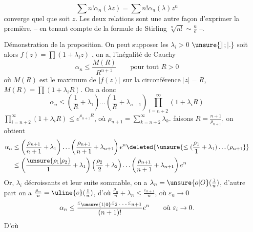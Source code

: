 \[ \sum n!\alpha_n(\lambda z)=\sum n!\alpha_n(\lambda)z^n \]
converge
quel que soit $z$. Les deux  relations
 sont une autre façon d'exprimer la première,
-- en tenant compte de la formule de
Stirling $\sqrt[n]{n!}\sim\frac{n}{e}$ --.

Démonstration de la proposition. On peut
supposer les $\lambda_i>0$  $\unsure{]|;|.}$ soit alors $f(z)=\prod(1+\lambda_i z)$
,   on a,  l'inégalité
de Cauchy
\[ \alpha_n\leq\frac{M(R)}{R^{n+1}}\qquad\text{pour tout }R>0 \]
où $M(R)$ est le maximum de $|f(z)|$ sur la
circonférence $|z|=R$,  $M(R)=\prod(1+\lambda_iR)$.
 On a donc
\[ \alpha_n\leq\left(\frac1R+\lambda_1\right)\ldots\left(\frac1R+\lambda_{n+1}\right)\prod_{i=n+2}^{\infty}(1+\lambda_i R) \]
  $\prod_{i=n+2}^{\infty}(1+\lambda_i R)\leq e^{\rho_{n+1}R}$, où
$\rho_{n+1}=\sum_{k=n+2}^{\infty}\lambda_k$. faisons $R=\frac{n+1}{\rho_{n+1}}$, on obtient
\[ \begin{aligned} \alpha_n&\leq\left(\frac{\rho_{n+1}}{n+1}+\lambda_1\right)\ldots\left(\frac{\rho_{n+1}}{n+1}+\lambda_{n+1}\right)e^n \deleted{\unsure{\leq(\frac{\rho_1}{1}+\lambda_1)\ldots(\rho_{n+1}}}\\ &\leq\left(\frac{\unsure{\rho_1|\rho_2}}{1}+\lambda_1\right)\left(\frac{\rho_2}{2}+\lambda_2\right)\ldots\left(\frac{\rho_{n+1}}{n+1}+\lambda_{n+1}\right)e^n \end{aligned} \]
Or,   $\lambda_i$   décroissants et leur
suite sommable, on a $\lambda_n=\unsure{o|O}(\frac1n)$, d'autre part on
a  $\frac{\rho_n}{n}=\uline{o}(\frac{1}{n})$, d'où $\frac{\rho_n}{n}+\lambda_n\leq\frac{\varepsilon_{n+1}}{n}$, où $\varepsilon_n\to0$
\[ \alpha_n\leq\frac{\varepsilon_{\unsure{1|0}}\varepsilon_2\ldots\varepsilon_{n+1}}{(n+1)!}e^n\qquad\text{où }\varepsilon_i\to0. \]
D'où

